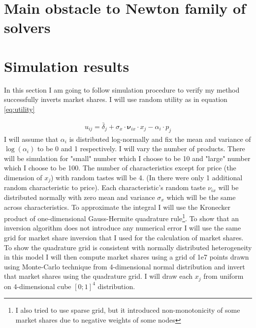 \documentclass[12pt,letterpaper]{article}
\begin{document}
	\section{Main obstacle to Newton family of solvers}
	
	\section{Simulation results}
	
	In this section I am going to follow \cite{berry2007pure} simulation procedure to verify my method successfully inverts market shares. I will use random utility as in equation \ref{eq:utility}
	
	\begin{align}
		u_{ij} = {\bar \delta_j} + \sigma_x \cdot \boldsymbol{\nu}_{ix} \cdot x_j - \alpha_i\cdot p_j
	\end{align}
	I will assume that $\alpha_i$ is distributed log-normally and fix the mean and variance of $\log(\alpha_i)$ to be 0 and 1 respectively. I will vary the number of products. There will be simulation for "small" number which I choose to be 10 and "large" number which I choose to be 100. The number of characteristics except for price (the dimension of $x_j$) with random tastes will be 4. (In \cite{berry2007pure} there were only 1 additional random characteristic to price). Each characteristic's random taste $\nu_{ix}$ will be distributed normally with zero mean and variance $\sigma_x$ which will be the same across characteristics. To approximate the integral I will use the Kronecker product of one-dimensional Gauss-Hermite quadrature rule\footnote{I also tried to use sparse grid, but it introduced non-monotonicity of some market shares due to negative weights of some nodes}. To show that an inversion algorithm does not introduce any numerical error I will use the same grid for market share inversion that I used for the calculation of market shares. To show the quadrature grid is consistent with normally distributed heterogeneity in this model I will then compute market shares using a grid of 1e7 points drawn using Monte-Carlo technique from 4-dimensional normal distribution and invert that market shares using the quadrature grid. I will draw  each $x_j$ from uniform on 4-dimensional cube $[0; 1]^4$ distribution. 
	
\end{document}
